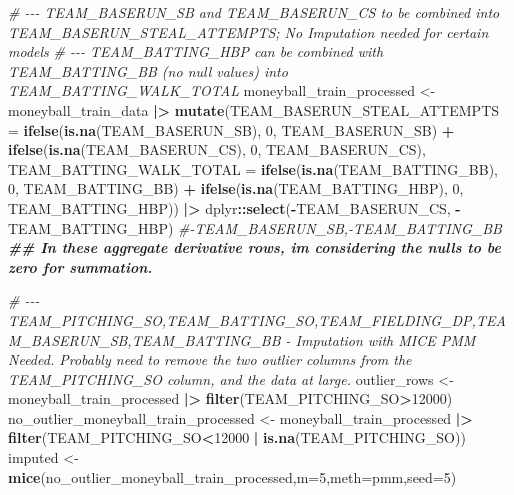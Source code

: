 \documentclass[
]{article}
\newenvironment{Shaded}{\begin{snugshade}}{\end{snugshade}}
\newcommand{\AttributeTok}[1]{\textcolor[rgb]{0.13,0.29,0.53}{#1}}
\newcommand{\CommentTok}[1]{\textcolor[rgb]{0.56,0.35,0.01}{\textit{#1}}}
\newcommand{\DecValTok}[1]{\textcolor[rgb]{0.00,0.00,0.81}{#1}}
\newcommand{\DocumentationTok}[1]{\textcolor[rgb]{0.56,0.35,0.01}{\textbf{\textit{#1}}}}
\newcommand{\FunctionTok}[1]{\textcolor[rgb]{0.13,0.29,0.53}{\textbf{#1}}}
\newcommand{\NormalTok}[1]{#1}
\newcommand{\OtherTok}[1]{\textcolor[rgb]{0.56,0.35,0.01}{#1}}
\newcommand{\SpecialCharTok}[1]{\textcolor[rgb]{0.81,0.36,0.00}{\textbf{#1}}}
\newcommand{\StringTok}[1]{\textcolor[rgb]{0.31,0.60,0.02}{#1}}
\begin{document}
\begin{Shaded}
\begin{Highlighting}[]
\CommentTok{\# {-}{-}{-} TEAM\_BASERUN\_SB and TEAM\_BASERUN\_CS to be combined into TEAM\_BASERUN\_STEAL\_ATTEMPTS; No Imputation needed for certain models}
\CommentTok{\# {-}{-}{-} TEAM\_BATTING\_HBP can be combined with TEAM\_BATTING\_BB (no null values) into TEAM\_BATTING\_WALK\_TOTAL}
\NormalTok{moneyball\_train\_processed }\OtherTok{\textless{}{-}}\NormalTok{ moneyball\_train\_data }\SpecialCharTok{|\textgreater{}} 
  \FunctionTok{mutate}\NormalTok{(}\AttributeTok{TEAM\_BASERUN\_STEAL\_ATTEMPTS =} \FunctionTok{ifelse}\NormalTok{(}\FunctionTok{is.na}\NormalTok{(TEAM\_BASERUN\_SB), }\DecValTok{0}\NormalTok{, TEAM\_BASERUN\_SB) }\SpecialCharTok{+} \FunctionTok{ifelse}\NormalTok{(}\FunctionTok{is.na}\NormalTok{(TEAM\_BASERUN\_CS), }\DecValTok{0}\NormalTok{, TEAM\_BASERUN\_CS),}
         \AttributeTok{TEAM\_BATTING\_WALK\_TOTAL =} \FunctionTok{ifelse}\NormalTok{(}\FunctionTok{is.na}\NormalTok{(TEAM\_BATTING\_BB), }\DecValTok{0}\NormalTok{, TEAM\_BATTING\_BB) }\SpecialCharTok{+} \FunctionTok{ifelse}\NormalTok{(}\FunctionTok{is.na}\NormalTok{(TEAM\_BATTING\_HBP), }\DecValTok{0}\NormalTok{, TEAM\_BATTING\_HBP)) }\SpecialCharTok{|\textgreater{}}
\NormalTok{  dplyr}\SpecialCharTok{::}\FunctionTok{select}\NormalTok{(}\SpecialCharTok{{-}}\NormalTok{TEAM\_BASERUN\_CS, }\SpecialCharTok{{-}}\NormalTok{TEAM\_BATTING\_HBP) }\CommentTok{\#{-}TEAM\_BASERUN\_SB,{-}TEAM\_BATTING\_BB}
\DocumentationTok{\#\# In these aggregate derivative rows, im considering the nulls to be zero for summation. }

 

\CommentTok{\# {-}{-}{-} TEAM\_PITCHING\_SO,TEAM\_BATTING\_SO,TEAM\_FIELDING\_DP,TEAM\_BASERUN\_SB,TEAM\_BATTING\_BB {-} Imputation with MICE PMM Needed. Probably need to remove the two outlier columns from the TEAM\_PITCHING\_SO column, and the data at large.}
\NormalTok{outlier\_rows }\OtherTok{\textless{}{-}}\NormalTok{ moneyball\_train\_processed }\SpecialCharTok{|\textgreater{}} \FunctionTok{filter}\NormalTok{(TEAM\_PITCHING\_SO}\SpecialCharTok{\textgreater{}}\DecValTok{12000}\NormalTok{)}
\NormalTok{no\_outlier\_moneyball\_train\_processed }\OtherTok{\textless{}{-}}\NormalTok{ moneyball\_train\_processed }\SpecialCharTok{|\textgreater{}} \FunctionTok{filter}\NormalTok{(TEAM\_PITCHING\_SO}\SpecialCharTok{\textless{}}\DecValTok{12000} \SpecialCharTok{|} \FunctionTok{is.na}\NormalTok{(TEAM\_PITCHING\_SO))}
\NormalTok{imputed }\OtherTok{\textless{}{-}} \FunctionTok{mice}\NormalTok{(no\_outlier\_moneyball\_train\_processed,}\AttributeTok{m=}\DecValTok{5}\NormalTok{,}\AttributeTok{meth=}\StringTok{\textquotesingle{}pmm\textquotesingle{}}\NormalTok{,}\AttributeTok{seed=}\DecValTok{5}\NormalTok{)}
\end{Highlighting}
\end{Shaded}
\end{document}
